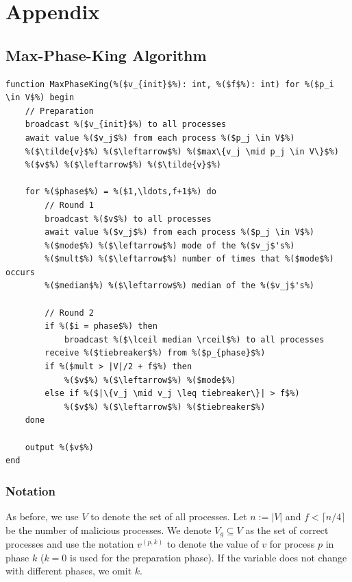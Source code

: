 \documentclass[runningheads]{llncs}
\begin{document}
%
%


\newpage 
\appendix
\section{Appendix}\label{appendix}
\subsection{Max-Phase-King Algorithm}\label{appendix:maxphaseking}
\begin{lstlisting}
function MaxPhaseKing(%($v_{init}$%): int, %($f$%): int) for %($p_i \in V$%) begin 
    // Preparation
    broadcast %($v_{init}$%) to all processes
    await value %($v_j$%) from each process %($p_j \in V$%)
    %($\tilde{v}$%) %($\leftarrow$%) %($max\{v_j \mid p_j \in V\}$%)
    %($v$%) %($\leftarrow$%) %($\tilde{v}$%)

    for %($phase$%) = %($1,\ldots,f+1$%) do
        // Round 1
        broadcast %($v$%) to all processes
        await value %($v_j$%) from each process %($p_j \in V$%)
        %($mode$%) %($\leftarrow$%) mode of the %($v_j$'s%)
        %($mult$%) %($\leftarrow$%) number of times that %($mode$%) occurs 
        %($median$%) %($\leftarrow$%) median of the %($v_j$'s%)

        // Round 2
        if %($i = phase$%) then 
            broadcast %($\lceil median \rceil$%) to all processes 
        receive %($tiebreaker$%) from %($p_{phase}$%)
        if %($mult > |V|/2 + f$%) then 
            %($v$%) %($\leftarrow$%) %($mode$%)
        else if %($|\{v_j \mid v_j \leq tiebreaker\}| > f$%)
            %($v$%) %($\leftarrow$%) %($tiebreaker$%)
    done

    output %($v$%)
end
\end{lstlisting}

\subsubsection{Notation} As before, we use $V$ to denote the set of all processes. Let $n := |V|$ and $f < \lceil n/4 \rceil$ be the number of malicious processes. We denote $V_g \subseteq V$ as the set of correct processes and use the notation $v^{(p, k)}$ to denote the value of $v$ for process $p$ in phase $k$ ($k=0$ is used for the preparation phase). If the variable does not change with different phases, we omit $k$.
\end{document}
